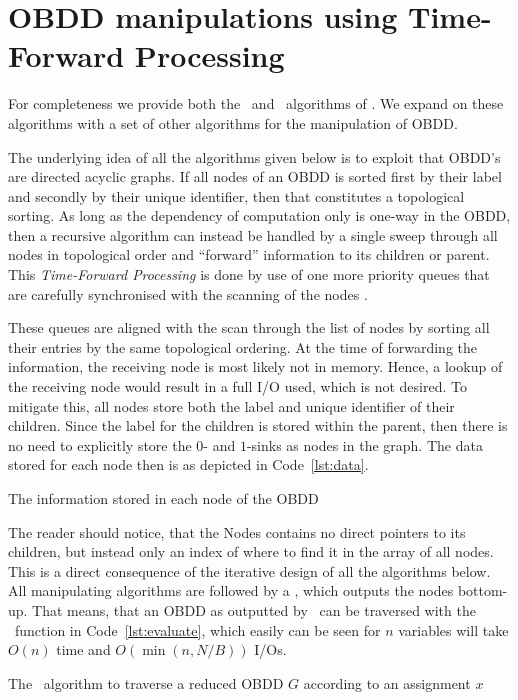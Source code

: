 \newpage
\section{OBDD manipulations using Time-Forward Processing} \label{sec:theory}

For completeness we provide both the \Reduce\ and \Apply\ algorithms of
\cite{Arge96}. We expand on these algorithms with a set of other algorithms for
the manipulation of OBDD.

The underlying idea of all the algorithms given below is to exploit that OBDD's
are directed acyclic graphs. If all nodes of an OBDD is sorted first by their
label and secondly by their unique identifier, then that constitutes a
topological sorting. As long as the dependency of computation only is one-way in
the OBDD, then a recursive algorithm can instead be handled by a single sweep
through all nodes in topological order and ``forward'' information to its
children or parent. This \emph{Time-Forward Processing} is done by use of one
more priority queues that are carefully synchronised with the scanning of the
nodes \todocite.

These queues are aligned with the scan through the list of nodes by sorting all
their entries by the same topological ordering. At the time of forwarding the
information, the receiving node is most likely not in memory. Hence, a lookup of
the receiving node would result in a full I/O used, which is not desired. To
mitigate this, all nodes store both the label and unique identifier of their
children. Since the label for the children is stored within the parent, then
there is no need to explicitly store the $0$- and $1$-sinks as nodes in the
graph. The data stored for each node then is as depicted in Code~\ref{lst:data}.
\begin{lstfloat}[ht!]
  \centering

  

  \caption{The information stored in each node of the OBDD}
  \label{lst:data}
\end{lstfloat}

The reader should notice, that the Nodes contains no direct pointers to its
children, but instead only an index of where to find it in the array of all
nodes. This is a direct consequence of the iterative design of all the
algorithms below. All manipulating algorithms are followed by a \Reduce, which
outputs the nodes bottom-up. That means, that an OBDD as outputted by \Reduce\
can be traversed with the \Evaluate\ function in Code~\ref{lst:evaluate}, which
easily can be seen for $n$ variables will take $O(n)$ time and $O(\min(n, N/B))$
I/Os.
\begin{lstfloat}[ht!]
  \centering

  

  \caption{The \Evaluate\ algorithm to traverse a reduced OBDD $G$ according to an
    assignment $x$}
  \label{lst:evaluate}
\end{lstfloat}

